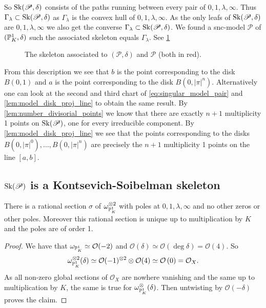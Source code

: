 So $\operatorname{Sk}(\mathscr P, \delta)$ consists of the paths running between every pair of $0, 1, \lambda, \infty$. Thus $\Gamma_\lambda \subset \operatorname{Sk}(\mathscr P, \delta)$ as $\Gamma_\lambda$ is the convex hull of $0, 1, \lambda, \infty$.
As  the only leafs of $\operatorname{Sk}(\mathscr P, \delta)$ are $0, 1, \lambda, \infty$ we also get the converse $\Gamma_\lambda \subset  \operatorname{Sk}(\mathscr P, \delta)$. 
We found a snc-model $\mathscr P$ of $(\mathbb{P}^{1}_K, \delta)$ such the associated skeleton equals $\Gamma_\lambda$. 
See \cref{fig:skeleton_of_the_pair}

\begin{figure}[ht]
    \centering
    \caption{The skeleton associated to $(\mathscr P, \delta)$ and $\mathscr P$ (both in red).}
    \label{fig:skeleton_of_the_pair}
\end{figure}

From this description we see that $b$ is the point corresponding to the disk $B(0, 1)$ and $a$ is the point corresponding to the disk $B(0, |\pi|^{n})$. 
Alternatively one can look at the second and third chart of \cref{eq:singular_model_pair} and \cref{lem:model_disk_proj_line} to obtain the same result. 
By \cref{lem:number_divisorial_points} we know that there are exactly $n + 1$ multiplicity 1 points on $\operatorname{Sk}(\mathscr P)$, one for every irreducible component.
By \cref{lem:model_disk_proj_line} we see that the points corresponding to the disks $B(0, |\pi|^{0}), \ldots, B(0, |\pi|^{n})$ are precisely the $n + 1$ multiplicity 1 points on the line $[a, b]$. 

\subsection{$\operatorname{Sk}(\mathscr P)$ is a Kontsevich-Soibelman skeleton} \label{sec:sk_P_is_a_kontsevich-soibelman_skeleton}

\begin{lemma}\label{lem:unique_form_pair}
	There is a rational section $\sigma$ of $\omega_{\mathbb{P}^{1}_K}^{\otimes 2}$ with poles at  $0, 1, \lambda, \infty$ and no other zeros or other poles. 
	Moreover this rational section is unique up to multiplication by $K$ and the poles are of order 1. 
\end{lemma}
\begin{proof}
	We have that $\omega_{\mathbb{P}^{1}_K} \simeq \mathcal{O}(-2)$ and $\mathcal{O}(\delta) \simeq \mathcal{O}(\deg \delta) = \mathcal{O}(4)$.
	So \[
		\omega_{\mathbb{P}^{1}_K}^{\otimes 2} (\delta) \simeq \mathcal{O}(-1)^{\otimes 2} \otimes \mathcal{O}(4) \simeq \mathcal{O}\left(0 \right)  = \mathcal{O}_X
	.\] 
	As all non-zero global sections of $\mathcal{O}_X$ are nowhere vanishing and the same up to multiplication by $K$,  the same is true for $\omega^{\otimes}_{\mathbb{P}^{1}_K}(\delta)$.
	Then untwisting by $\mathcal{O}(-\delta)$ proves the claim. 
\end{proof}

